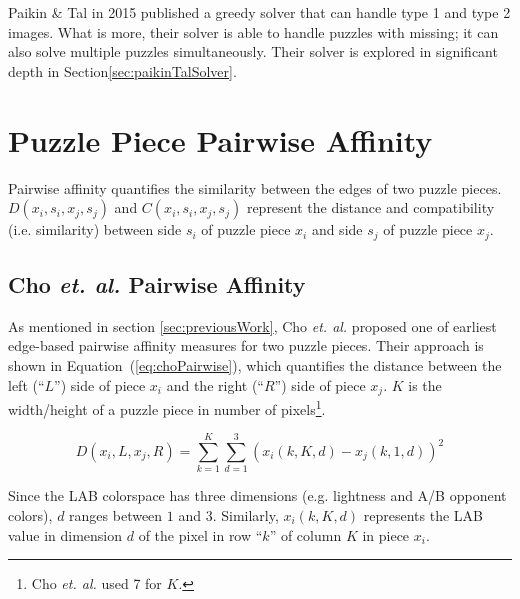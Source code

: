 \documentclass{report}
\def\eref#1{(\ref{#1})}
\begin{document}
Paikin \& Tal \cite{paikin2015} in 2015 published a greedy solver that can handle type 1 and type 2 images.  What is more, their solver is able to handle puzzles with missing; it can also solve multiple puzzles simultaneously.  Their solver is explored in significant depth in Section\ref{sec:paikinTalSolver}.















\pagebreak
\section{Puzzle Piece Pairwise Affinity}\label{sec:piecePairwiseAffinity}

Pairwise affinity quantifies the similarity between the edges of two puzzle pieces.  $D(x_i, s_i, x_j, s_j)$ and $C(x_i, s_i, x_j, s_j)$ represent the distance and compatibility (i.e. similarity) between side $s_i$ of puzzle piece $x_i$ and side $s_j$ of puzzle piece $x_j$.  

\subsection{Cho \textit{et. al.} Pairwise Affinity}\label{sec:choPairwiseAffinity}

As mentioned in section \ref{sec:previousWork}, Cho \textit{et. al.} \cite{cho2010} proposed one of earliest edge-based pairwise affinity measures for two puzzle pieces.  Their approach is shown in Equation~\eref{eq:choPairwise}, which quantifies the distance between the left (``$L$'') side of piece $x_i$ and the right (``$R$'') side of piece $x_j$.  $K$ is the width/height of a puzzle piece in number of pixels\footnote{Cho \textit{et. al.} used 7 for $K$.}.  

\begin{equation} \label{eq:choPairwise}
D(x_i,L,x_j,R) = \sum_{k=1}^{K}\sum_{d=1}^{3}(x_i(k,K,d) - x_j(k,1,d))^2
\end{equation}

Since the LAB colorspace has three dimensions (e.g. lightness and A/B opponent colors), $d$ ranges between $1$ and $3$.  Similarly, $x_i(k,K,d)$ represents the LAB value in dimension $d$ of the pixel in row ``$k$'' of column $K$ in piece $x_i$.
\end{document}
